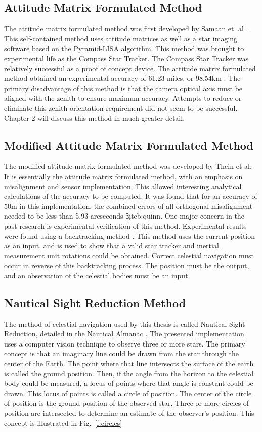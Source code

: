 \documentclass[12pt,a4paper]{book}
\begin{document}
\subsection*{Attitude Matrix Formulated Method}
The attitude matrix formulated method was first developed by Samaan et. al \cite{b:gps}.  This self-contained method uses attitude matrices as well as a star imaging software based on the Pyramid-LISA algorithm. This method was brought to experimental life as the Compass Star Tracker.  The Compass Star Tracker was relatively successful as a proof of concept device.  The attitude matrix formulated method obtained an experimental accuracy of 61.23 miles, or 98.54km \cite{b:swanzy}.  The primary disadvantage of this method is that the camera optical axis must be aligned with the zenith to ensure maximum accuracy.  Attempts to reduce or eliminate this zenith orientation requirement did not seem to be successful.   Chapter 2 will discuss this method in much greater detail.  
\subsection*{Modified Attitude Matrix Formulated Method}
The modified attitude matrix formulated method was developed by Thein et al.  It is essentially the attitude matrix formulated method, with an emphasis on misalignment and sensor implementation.  This allowed interesting analytical calculations of the accuracy to be computed.  It was found that for an accuracy of 50m in this implementation, the combined errors of all orthogonal misalignment needed to be less than 5.93 arcseconds \c3ite{b:quinn}.  One major concern in the past research is experimental verification of this method.  Experimental results were found using a backtracking method \cite{b:perkinsthesis}.  This method uses the current position as an input, and is used to show that a valid star tracker and inertial measurement unit rotations could be obtained.  Correct celestial navigation must occur in reverse of this backtracking process.  The position must be the output, and an observation of the celestial bodies must be an input.
\subsection*{Nautical Sight Reduction Method}
The method of celestial navigation used by this thesis is called Nautical Sight Reduction, detailed in the Nautical Almanac \cite{b:naut}.  The presented implementation uses a computer vision technique to observe three or more stars.  The primary concept is that an imaginary line could be drawn from the star through the center of the Earth. The point where that line intersects the surface of the earth is called the ground position.  Then, if the angle from the horizon to the celestial body could be measured, a locus of points where that angle is constant could be drawn.  This locus of points is called a circle of position. The center of the circle of position is the ground position of the observed star.  Three or more circles of position are intersected to determine an estimate of the observer's position.  This concept is illustrated in Fig.~\ref{f:circles}
\end{document}
